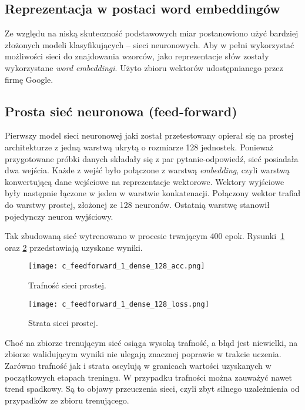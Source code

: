 \subsection{Reprezentacja w postaci word embeddingów}
Ze względu na niską skuteczność podstawowych miar postanowiono użyć bardziej złożonych modeli klasyfikujących -- sieci neuronowych. Aby w pełni wykorzystać możliwości sieci do znajdowania wzorców, jako reprezentacje słów zostały wykorzystane \textit{word embeddingi}. Użyto zbioru wektorów udostępnianego przez firmę Google.

\subsection{Prosta sieć neuronowa (feed-forward)}

Pierwszy model sieci neuronowej jaki został przetestowany opierał się na prostej architekturze z jedną warstwą ukrytą o rozmiarze 128 jednostek. Ponieważ przygotowane próbki danych składały się z par pytanie-odpowiedź, sieć posiadała dwa wejścia. Każde z wejść było połączone z warstwą \textit{embedding}, czyli warstwą konwertującą dane wejściowe na reprezentacje wektorowe. Wektory wyjściowe były następnie łączone w jeden w warstwie konkatenacji. Połączony wektor trafiał do warstwy prostej, złożonej ze 128 neuronów. Ostatnią warstwę stanowił pojedynczy neuron wyjściowy.

Tak zbudowaną sieć wytrenowano w procesie trwającym 400 epok. Rysunki~\ref{c_feedforward_acc} oraz \ref{c_feedforward_loss} przedstawiają uzyskane wyniki.

\begin{figure}[H]
\centering
\texttt{[image: c\_feedforward\_1\_dense\_128\_acc.png]}
\caption{Trafność sieci prostej.}
\label{c_feedforward_acc}
\end{figure}

\begin{figure}[H]
\centering
\texttt{[image: c\_feedforward\_1\_dense\_128\_loss.png]}
\caption{Strata sieci prostej.}
\label{c_feedforward_loss}
\end{figure}

Choć na zbiorze trenującym sieć osiąga wysoką trafność, a błąd jest niewielki, na zbiorze walidującym wyniki nie ulegają znacznej poprawie w trakcie uczenia. Zarówno trafność jak i strata oscylują w granicach wartości uzyskanych w początkowych etapach treningu. W przypadku trafności można zauważyć nawet trend spadkowy. Są to objawy przeuczenia sieci, czyli zbyt silnego uzależnienia od przypadków ze zbioru trenującego.

